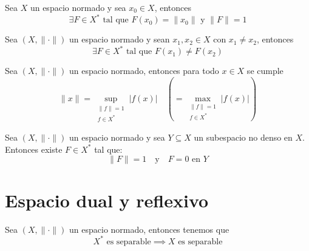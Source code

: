 \documentclass[12pt]{book}
\begin{document}
\begin{coro}\label{coro:hahn-banach-analitico}
    Sea $X$ un espacio normado y sea $x_0 \in X$, entonces
    \begin{equation*}
        \exists F \in X^* \text{ tal que } F(x_0) = \|x_0\| \text{ y } \|F\| = 1
    \end{equation*}
\end{coro}

\begin{coro}
    Sea $(X, \|\cdot\|)$ un espacio normado y sean $x_1, x_2 \in X$ con $x_1 \neq x_2$, entonces
    \begin{equation*}
        \exists F \in X^* \text{ tal que } F(x_1) \neq F(x_2)
    \end{equation*}
\end{coro}

\begin{coro}\label{coro:hahn-banach-analitico-norma}
    Sea $(X, \|\cdot\|)$ un espacio normado, entonces para todo $x \in X$ se cumple
    \begin{equation*}
        \|x\| = \sup_{\substack{\|f\|=1 \\ f \in X^*}} |f(x)| \quad \left( = \max_{\substack{\|f\|=1 \\ f \in X^*}} |f(x)| \right)
    \end{equation*}
\end{coro}

\begin{coro}\label{coro:hahn-banach-analitico-no-denso}
    Sea $(X, \|\cdot\|)$ un espacio normado y sea $Y \subseteq X$ un subespacio no denso en $X$. Entonces existe $F \in X^*$ tal que:
    \begin{equation*}
        \|F\| = 1 \quad \text{y} \quad F = 0 \text{ en } Y
    \end{equation*}
\end{coro}

\section{Espacio dual y reflexivo}

\begin{teo}\label{teo:separable-dual-separable}
    Sea $(X, \|\cdot\|)$ un espacio normado, entonces tenemos que 
    \begin{equation*}
        X^* \text{ es separable} \implies X \text{ es separable}
    \end{equation*}
\end{teo}
\end{document}
